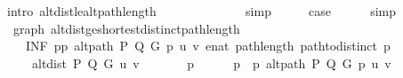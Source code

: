 \begin{isabellebody}
\ {\isacharparenleft}{\kern0pt}intro\ alt{\isacharunderscore}{\kern0pt}dist{\isacharunderscore}{\kern0pt}le{\isacharunderscore}{\kern0pt}alt{\isacharunderscore}{\kern0pt}path{\isacharunderscore}{\kern0pt}length{\isacharparenright}{\kern0pt}\isanewline
\ \ \isamarkupfalse%
\ \isamarkupfalse%
\ {\isachardoublequoteopen}{\isachardot}{\kern0pt}{\isachardot}{\kern0pt}{\isachardot}{\kern0pt}\ {\isacharless}{\kern0pt}\ {\isasyminfinity}{\isachardoublequoteclose}\isanewline
\ \ \ \ \isamarkupfalse%
\ simp\isanewline
\ \ \isamarkupfalse%
\ \isamarkupfalse%
\ {\isacharquery}{\kern0pt}case\isanewline
\ \ \ \ \isamarkupfalse%
\ simp\isanewline
{}\isamarkupfalse%
%
\endisatagproof
{\isafoldproof}%
%
\isadelimproof
\isanewline
%
\endisadelimproof
%
\isadeliminvisible
\isanewline
%
\endisadeliminvisible
%
\isataginvisible
{}\isamarkupfalse%
\ {\isacharparenleft}{\kern0pt}\ graph{\isacharparenright}{\kern0pt}\ alt{\isacharunderscore}{\kern0pt}dist{\isacharunderscore}{\kern0pt}ge{\isacharunderscore}{\kern0pt}shortest{\isacharunderscore}{\kern0pt}distinct{\isacharunderscore}{\kern0pt}path{\isacharunderscore}{\kern0pt}length{\isacharcolon}{\kern0pt}\isanewline
\ \ \isanewline
\ \ \ \ {\isachardoublequoteopen}{\isacharparenleft}{\kern0pt}INF\ p{\isasymin}{\isacharbraceleft}{\kern0pt}p{\isachardot}{\kern0pt}\ alt{\isacharunderscore}{\kern0pt}path\ P\ Q\ G\ p\ u\ v{\isacharbraceright}{\kern0pt}{\isachardot}{\kern0pt}\ enat\ {\isacharparenleft}{\kern0pt}path{\isacharunderscore}{\kern0pt}length\ {\isacharparenleft}{\kern0pt}path{\isacharunderscore}{\kern0pt}to{\isacharunderscore}{\kern0pt}distinct\ p{\isacharparenright}{\kern0pt}{\isacharparenright}{\kern0pt}{\isacharparenright}{\kern0pt}\ {\isasymle}\isanewline
\ \ \ \ \ alt{\isacharunderscore}{\kern0pt}dist\ P\ Q\ G\ u\ v{\isachardoublequoteclose}%
\endisataginvisible
{\isafoldinvisible}%
%
\isadeliminvisible
\isanewline
%
\endisadeliminvisible
%
\isadelimproof
%
\endisadelimproof
%
\isatagproof
{}\isamarkupfalse%
\ {\isacharminus}{\kern0pt}\isanewline
\ \ \isacommand{{\isacharbraceleft}{\kern0pt}}\isamarkupfalse%
\ \isamarkupfalse%
\ p\isanewline
\ \ \ \ \isamarkupfalse%
\ {\isachardoublequoteopen}p\ {\isasymin}\ {\isacharbraceleft}{\kern0pt}p{\isachardot}{\kern0pt}\ alt{\isacharunderscore}{\kern0pt}path\ P\ Q\ G\ p\ u\ v{\isacharbraceright}{\kern0pt}{\isachardoublequoteclose}\isanewline
\ \ \ \ \isamarkupfalse%

\end{isabellebody}
